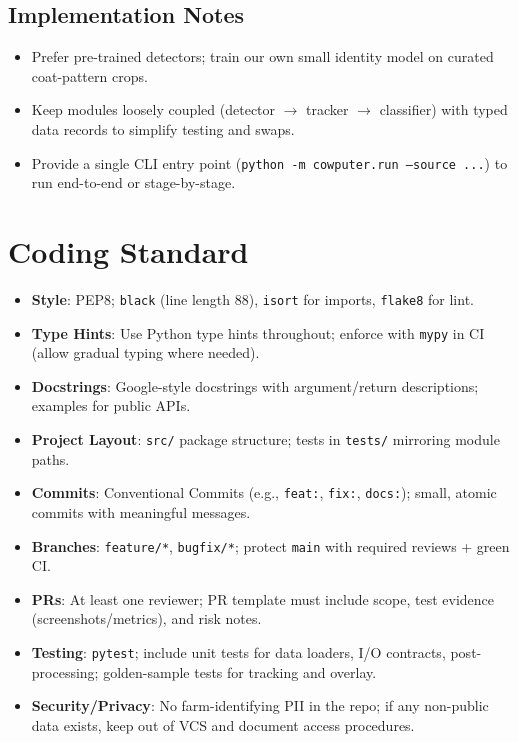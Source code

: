 \documentclass{article}
\begin{document}
\subsection*{Implementation Notes}
\begin{itemize}
  \item Prefer pre-trained detectors; train our own small identity model on curated coat-pattern crops.
  \item Keep modules loosely coupled (detector $\rightarrow$ tracker $\rightarrow$ classifier) with typed data records to simplify testing and swaps.
  \item Provide a single CLI entry point (\texttt{python -m cowputer.run --source ...}) to run end-to-end or stage-by-stage.
\end{itemize}

\section{Coding Standard}

\begin{itemize}
  \item \textbf{Style}: PEP8; \texttt{black} (line length 88), \texttt{isort} for imports, \texttt{flake8} for lint.
  \item \textbf{Type Hints}: Use Python type hints throughout; enforce with \texttt{mypy} in CI (allow gradual typing where needed).
  \item \textbf{Docstrings}: Google-style docstrings with argument/return descriptions; examples for public APIs.
  \item \textbf{Project Layout}: \texttt{src/} package structure; tests in \texttt{tests/} mirroring module paths.
  \item \textbf{Commits}: Conventional Commits (e.g., \texttt{feat:}, \texttt{fix:}, \texttt{docs:}); small, atomic commits with meaningful messages.
  \item \textbf{Branches}: \texttt{feature/*}, \texttt{bugfix/*}; protect \texttt{main} with required reviews + green CI.
  \item \textbf{PRs}: At least one reviewer; PR template must include scope, test evidence (screenshots/metrics), and risk notes.
  \item \textbf{Testing}: \texttt{pytest}; include unit tests for data loaders, I/O contracts, post-processing; golden-sample tests for tracking and overlay.
  \item \textbf{Security/Privacy}: No farm-identifying PII in the repo; if any non-public data exists, keep out of VCS and document access procedures.
\end{itemize}
\end{document}
